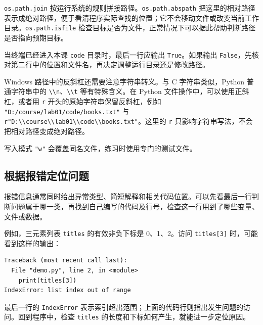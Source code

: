 \documentclass[UTF8,a4paper,11pt,fontset=fandol]{ctexart}
\providecommand{\passthrough}[1]{#1}
\begin{document}
\passthrough{\lstinline!os.path.join!} 按运行系统的规则拼接路径。\passthrough{\lstinline!os.path.abspath!} 把这里的相对路径表示成绝对路径，便于看清程序实际查找的位置；它不会移动文件或改变当前工作目录。\passthrough{\lstinline!os.path.isfile!} 检查目标是否为文件，正常情况下可以据此帮助判断路径是否指向预期目标。

当终端已经进入本课 \passthrough{\lstinline!code!} 目录时，最后一行应输出 \passthrough{\lstinline!True!}。如果输出 \passthrough{\lstinline!False!}，先核对第二行中的位置和文件名，再决定调整运行目录还是修改路径。

Windows 路径中的反斜杠还需要注意字符串转义。与 C 字符串类似，Python 普通字符串中的 \passthrough{\lstinline!\\n!}、\passthrough{\lstinline!\\t!} 等有特殊含义。在 Python 文件操作中，可以使用正斜杠，或者用 \passthrough{\lstinline!r!} 开头的原始字符串保留反斜杠，例如 \passthrough{\lstinline!"D:/course/lab01/code/books.txt"!} 与 \passthrough{\lstinline!r"D:\\course\\lab01\\code\\books.txt"!}。这里的 \passthrough{\lstinline!r!} 只影响字符串写法，不会把相对路径变成绝对路径。

写入模式 \passthrough{\lstinline!"w"!} 会覆盖同名文件，练习时使用专门的测试文件。

\clearpage

\subsection{根据报错定位问题}\label{ux6839ux636eux62a5ux9519ux5b9aux4f4dux95eeux9898}

报错信息通常同时给出异常类型、简短解释和相关代码位置。可以先看最后一行判断问题属于哪一类，再找到自己编写的代码及行号，检查这一行用到了哪些变量、文件或数据。

例如，三元素列表 \passthrough{\lstinline!titles!} 的有效非负下标是 0、1、2。访问 \passthrough{\lstinline!titles[3]!} 时，可能看到这样的输出：

\begin{lstlisting}[language={}]
Traceback (most recent call last):
  File "demo.py", line 2, in <module>
    print(titles[3])
IndexError: list index out of range
\end{lstlisting}

最后一行的 \passthrough{\lstinline!IndexError!} 表示索引超出范围；上面的代码行则指出发生问题的访问。回到程序中，检查 \passthrough{\lstinline!titles!} 的长度和下标如何产生，就能进一步定位原因。
\end{document}
